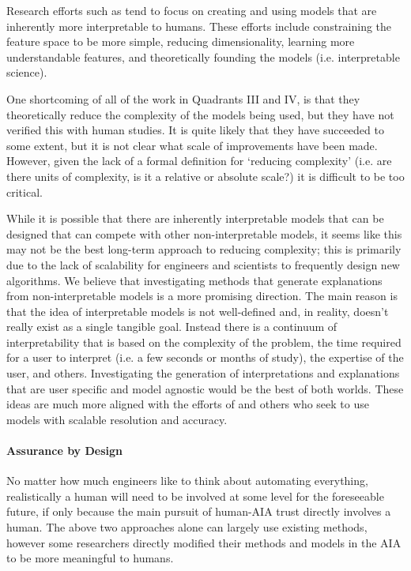     Research efforts such as \cite{Caruana2015-za,Huysmans2011-th,Faghmous2014-og,Venna2007-yj,Vellido2012-nm,Kadous1999-rx,Lomas2012-ie} tend to focus on creating and using models that are inherently more interpretable to humans. These efforts include constraining the feature space to be more simple, reducing dimensionality, learning more understandable features, and theoretically founding the models (i.e. interpretable science).

    One shortcoming of all of the work in Quadrants III and IV, is that they theoretically reduce the complexity of the models being used, but they have not verified this with human studies. It is quite likely that they have succeeded to some extent, but it is not clear what scale of improvements have been made. However, given the lack of a formal definition for `reducing complexity' (i.e. are there units of complexity, is it a relative or absolute scale?) it is difficult to be too critical.
    
    While it is possible that there are inherently interpretable models that can be designed that can compete with other non-interpretable models, it seems like this may not be the best long-term approach to reducing complexity; this is primarily due to the lack of scalability for engineers and scientists to frequently design new algorithms. We believe that investigating methods that generate explanations from non-interpretable models is a more promising direction. The main reason is that the idea of interpretable models is not well-defined and, in reality, doesn't really exist as a single tangible goal. Instead there is a continuum of interpretability that is based on the complexity of the problem, the time required for a user to interpret (i.e. a few seconds or months of study), the expertise of the user, and others. Investigating the generation of interpretations and explanations that are user specific and model agnostic would be the best of both worlds. These ideas are much more aligned with the efforts of \cite{Ruping2006-xj} and others who seek to use models with scalable resolution and accuracy.

    \paragraph{Assurance by Design} No matter how much engineers like to think about automating everything, realistically a human will need to be involved at some level for the foreseeable future, if only because the main pursuit of human-AIA trust directly involves a human. The above two approaches alone can largely use existing methods, however some researchers directly modified their methods and models in the AIA to be more meaningful to humans.

